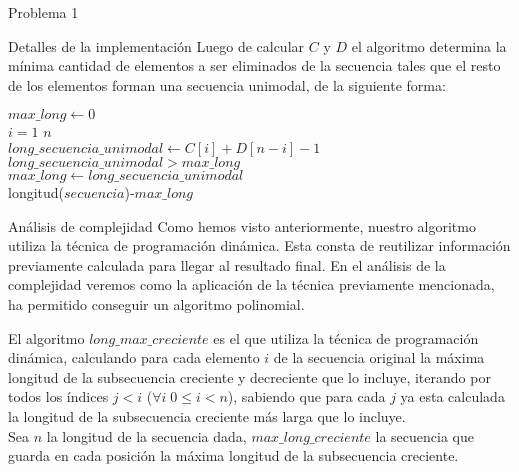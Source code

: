 \begin{section}{Problema 1}
\begin{subsection}{Detalles de la implementación}
		Luego de calcular $C$ y $D$ el algoritmo determina la mínima cantidad de elementos a ser eliminados de
		la secuencia tales que el resto de los elementos forman una secuencia unimodal, de la siguiente forma:
		
		\vspace{0.5cm}
		\begin{pseudo}
			\tab $max\_long \leftarrow 0$ \\
			\tab \FOR $i=1$ \TO $n$ \\
			\tab \tab $long\_secuencia\_unimodal\leftarrow C[i]+D[n-i]-1$ \\
			\tab \tab \IF $ long\_secuencia\_unimodal >  max\_long$ \\
			\tab \tab \tab $max\_long \leftarrow long\_secuencia\_unimodal$ \\
			\tab \RET longitud($secuencia$)-$max\_long$
		\end{pseudo}

	\end{subsection}


	\begin{subsection}{Análisis de complejidad}
		Como hemos visto anteriormente, nuestro algoritmo utiliza la técnica de programación dinámica. Esta consta de 
		reutilizar información previamente calculada para llegar al resultado final. En el análisis de la complejidad veremos como la
		aplicación de la técnica previamente mencionada, ha permitido conseguir un algoritmo polinomial.
	
		El algoritmo $long\_max\_creciente$ es el que utiliza la técnica de programación dinámica, calculando para cada elemento 
		$i$ de la secuencia original la máxima longitud de la subsecuencia creciente y decreciente que lo incluye, iterando 
		por todos los índices $j<i$ ($\forall i\; 0 \leq i < n$), sabiendo que para cada $j$ ya esta calculada la longitud de 
		la subsecuencia creciente más larga que lo incluye.\\

		Sea $n$ la longitud de la secuencia dada, $max\_long\_creciente$ la secuencia que guarda en cada posición la máxima 
		longitud de la subsecuencia creciente.\\


\end{subsection}
\end{section}
